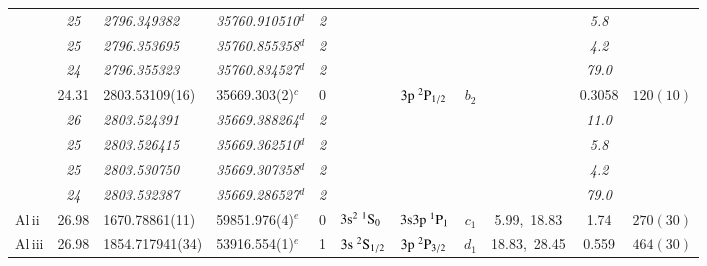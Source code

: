 \documentclass[useAMS,usenatbib]{mn2e}
\begin{document}
\begin{table*}
\begin{center}
\begin{minipage}{0.977\textwidth}
\begin{tabular}{lcllcllcccc}
              & \it{25}&\it{2796.349382}    &\it{35760.910510}$^d$     &\it{2}&                                            &                                                    &        &              & \it{5.8}& $          $\\
              & \it{25}&\it{2796.353695}    &\it{35760.855358}$^d$     &\it{2}&                                            &                                                    &        &              & \it{4.2}& $          $\\
              & \it{24}&\it{2796.355323}    &\it{35760.834527}$^d$     &\it{2}&                                            &                                                    &        &              &\it{79.0}& $          $\\
              & 24.31  & 2803.53109(16)     & 35669.303(2)$^c$         & 0    &                                            & $3\rm{p}~^2\rm{P}_{1/2}$                           & $b_2$  &              &  0.3058 & $  120(10) $\\
              & \it{26}&\it{2803.524391}    & \it{35669.388264}$^d$    &\it{2}&                                            &                                                    &        &              &\it{11.0}& $          $\\
              & \it{25}&\it{2803.526415}    & \it{35669.362510}$^d$    &\it{2}&                                            &                                                    &        &              & \it{5.8}& $          $\\
              & \it{25}&\it{2803.530750}    & \it{35669.307358}$^d$    &\it{2}&                                            &                                                    &        &              & \it{4.2}& $          $\\
              & \it{24}&\it{2803.532387}    & \it{35669.286527}$^d$    &\it{2}&                                            &                                                    &        &              &\it{79.0}& $          $\\
Al{\sc \,ii}  & 26.98  & 1670.78861(11)     & 59851.976(4)$^e$         & 0    & $3\rm{s}^2~^1\rm{S}_0$                     & $3\rm{s}3\rm{p}~^1\rm{P}_1$                        & $c_1$  & 5.99,~18.83  &  1.74   & $  270(30) $\\
Al{\sc \,iii} & 26.98  & 1854.717941(34)    & 53916.554(1)$^e$         & 1    & $3\rm{s}~^2\rm{S}_{1/2}$                   & $3\rm{p}~^2\rm{P}_{3/2}$                           & $d_1$  & 18.83,~28.45 &  0.559  & $  464(30) $\\

\end{tabular}
\end{minipage}
\end{center}
\end{table*}
\end{document}
